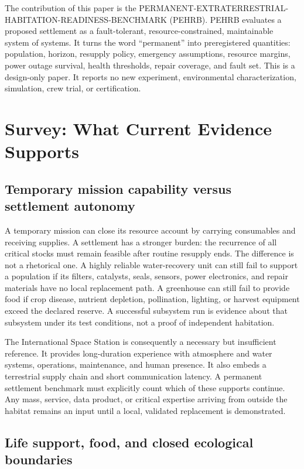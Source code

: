 \documentclass[10pt,conference]{IEEEtran}
\begin{document}
The contribution of this paper is the PERMANENT-EXTRATERRESTRIAL-HABITATION-READINESS-BENCHMARK (PEHRB). PEHRB evaluates a proposed settlement as a fault-tolerant, resource-constrained, maintainable system of systems. It turns the word ``permanent'' into preregistered quantities: population, horizon, resupply policy, emergency assumptions, resource margins, power outage survival, health thresholds, repair coverage, and fault set. This is a design-only paper. It reports no new experiment, environmental characterization, simulation, crew trial, or certification.

\section{Survey: What Current Evidence Supports}
\label{sec:survey}

\subsection{Temporary mission capability versus settlement autonomy}

A temporary mission can close its resource account by carrying consumables and receiving supplies. A settlement has a stronger burden: the recurrence of all critical stocks must remain feasible after routine resupply ends. The difference is not a rhetorical one. A highly reliable water-recovery unit can still fail to support a population if its filters, catalysts, seals, sensors, power electronics, and repair materials have no local replacement path. A greenhouse can still fail to provide food if crop disease, nutrient depletion, pollination, lighting, or harvest equipment exceed the declared reserve. A successful subsystem run is evidence about that subsystem under its test conditions, not a proof of independent habitation.

The International Space Station is consequently a necessary but insufficient reference. It provides long-duration experience with atmosphere and water systems, operations, maintenance, and human presence. It also embeds a terrestrial supply chain and short communication latency. A permanent settlement benchmark must explicitly count which of these supports continue. Any mass, service, data product, or critical expertise arriving from outside the habitat remains an input until a local, validated replacement is demonstrated.

\subsection{Life support, food, and closed ecological boundaries}
\end{document}
